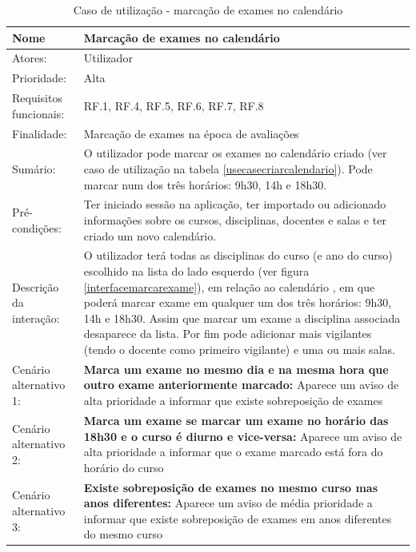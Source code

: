 \documentclass[11pt, twoside]{report}
\begin{document}
\def\arraystretch{1.5}
\begin{center}
	\label{usecasemarcarexame}
	\begin{longtable}{|m{4cm}|m{12cm}|}
		\caption{Caso de utilização - marcação de exames no calendário}\\
		
			\hline
		\textbf{Nome }	& \textbf{Marcação de exames no calendário} \\
		\hline
		Atores: & Utilizador\\
		\hline
		Prioridade: &  Alta\\
		\hline
		Requisitos funcionais:&  RF.1, RF.4, RF.5, RF.6, RF.7, RF.8\\
		\hline
		Finalidade: & Marcação de exames na época de avaliações\\
		\hline
		Sumário: & O utilizador pode marcar os exames no calendário criado (ver caso de utilização na tabela \ref{usecasecriarcalendario}). Pode marcar num dos três horários: 9h30, 14h e 18h30.\\
		\hline
		Pré-condições: & Ter iniciado sessão na aplicação, ter importado ou adicionado informações sobre os cursos, disciplinas, docentes e salas e ter criado um novo calendário.\\
		\hline
		Descrição da interação: & O utilizador terá todas as disciplinas do curso (e ano do curso) escolhido na lista do lado esquerdo (ver figura \ref{interfacemarcarexame}), em relação ao calendário , em que poderá marcar exame em qualquer um dos três horários: 9h30, 14h e 18h30. Assim que marcar um exame a disciplina associada desaparece da lista. Por fim pode adicionar mais vigilantes (tendo o docente como primeiro vigilante) e uma ou mais salas.  \\
		\hline
		Cenário alternativo 1: & \textbf{Marca um exame no mesmo dia e na mesma hora que outro exame anteriormente marcado:} Aparece um aviso de alta prioridade a informar que existe sobreposição de exames\\
		\hline
		
		
		Cenário alternativo 2: & \textbf{Marca um exame se marcar um exame no horário das 18h30 e o curso é diurno e vice-versa:} Aparece um aviso de alta prioridade a informar que o exame marcado está fora do horário do curso\\
		\hline
		
		Cenário alternativo 3: & \textbf{Existe sobreposição de exames no mesmo curso mas anos diferentes:} Aparece um aviso de média prioridade a informar que existe sobreposição de exames em anos diferentes do mesmo curso\\
		\hline
	\end{longtable}
\end{center}
\end{document}
